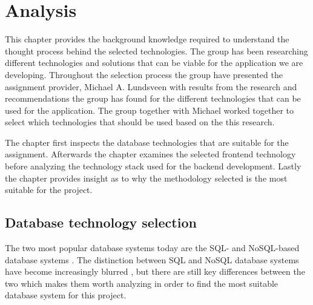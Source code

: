 \chapter{Analysis}
This chapter provides the background knowledge required to understand the thought process behind the selected technologies.
The group has been researching different technologies and solutions that can be viable for the application we are developing. Throughout the selection process the group have presented the assignment provider, Michael A. Lundsveen with results from the research and recommendations the group has found for the different technologies that can be used for the application. The group together with Michael worked together to select which technologies that should be used based on the this research.

The chapter first inspects the database technologies that are suitable for the assignment.
Afterwards the chapter examines the selected frontend technology before analyzing the technology stack used for the backend development.
Lastly the chapter provides insight as to why the methodology selected is the most suitable for the project.

    


\section{Database technology selection}
The two most popular database systems today are the SQL- and NoSQL-based database systems \cite{stackoverflow-db-statistics}.
The distinction between SQL and NoSQL database systems have become increasingly blurred \cite{sql-vs-nosql}, but there are still key differences between the two which makes them worth analyzing in order to find the most suitable database system for this project.

\iffalse
